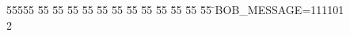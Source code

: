 %
%
\begin{tabbing}
55555 \= 55 \= 55 \= 55 \= 55 \= 55 \= 55 \= 55 \= 55 \= 55 \= 55 \= 55 \= 55 \= \>BOB\_MESSAGE=111101\\[0pt]
2\>\end{tabbing}
